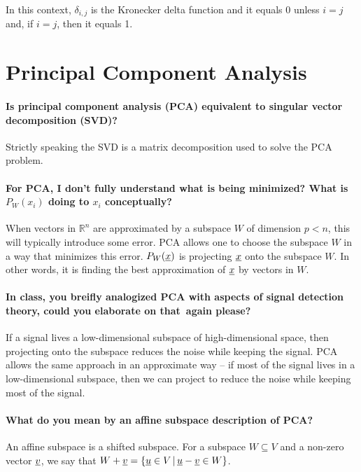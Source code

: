\documentclass[10pt,english]{article}
\begin{document}
In this context, $\delta_{i,j}$ is the Kronecker delta function and it equals 0 unless $i=j$ and, if $i=j$, then it equals 1.

\section{Principal Component Analysis}

\paragraph{Is principal component analysis (PCA) equivalent to singular vector decomposition (SVD)?}

Strictly speaking the SVD is a matrix decomposition used to solve the PCA problem.

\paragraph{For PCA, I don't fully understand what is being minimized? What is $P_W(x_i)$ doing to $x_i$ conceptually?}

When vectors in $\mathbb{R}^n$ are approximated by a subspace $W$ of dimension $p<n$, this will typically introduce some error.
PCA allows one to choose the subspace $W$ in a way that minimizes this error.
$P_W (\underline{x})$ is projecting $\underline{x}$ onto the subspace $W$.
In other words, it is finding the best approximation of $\underline{x}$ by vectors in $W$.

\paragraph{In class, you breifly analogized PCA with aspects of signal detection theory, could you elaborate on that again please?}

If a signal lives a low-dimensional subspace of high-dimensional space, then projecting onto the subspace reduces the noise while keeping the signal.
PCA allows the same approach in an approximate way -- if most of the signal lives in a low-dimensional subspace, then we can project to reduce the noise while keeping most of the signal.

\paragraph{What do you mean by an affine subspace description of PCA?}

An affine subspace is a shifted subspace.
For a subspace $W \subseteq V$ and a non-zero vector $\underline{v}$, we say that $W+\underline{v} = \{ \underline{u} \in V \,|\, \underline{u}-\underline{v} \in W \}$.
\end{document}
